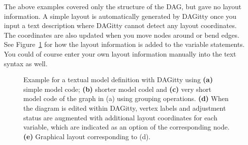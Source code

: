 \documentclass[a4paper]{article} %
\newcommand{\pp}{{\sc DAG}itty\xspace}
\begin{document}
The above examples covered only the structure of the DAG, but gave no layout information. A simple layout is automatically generated by \pp once you input a text description where \pp cannot detect any layout coordinates. The coordinates are also updated when you move nodes around or bend edges. See Figure~\ref{fig:syntax} for how the layout information is added to the variable statements. You could of course enter your own layout information manually into the text syntax as well.
\begin{figure}
\caption{
Example for a textual model definition with \pp using {\bfseries (a)} simple model code; 
{\bfseries (b)} shorter model codel
and {\bfseries (c)} very short model code of the graph in (a) using 
 grouping operations. {\bfseries (d)} When the diagram is edited within \pp, vertex labels 
and adjustment status are augmented with additional layout coordinates
for each variable, which are indicated as an option of the corresponding node.
{\bfseries (e)} Graphical layout corresponding to (d).
}
\label{fig:syntax}
\end{figure}
\end{document}
